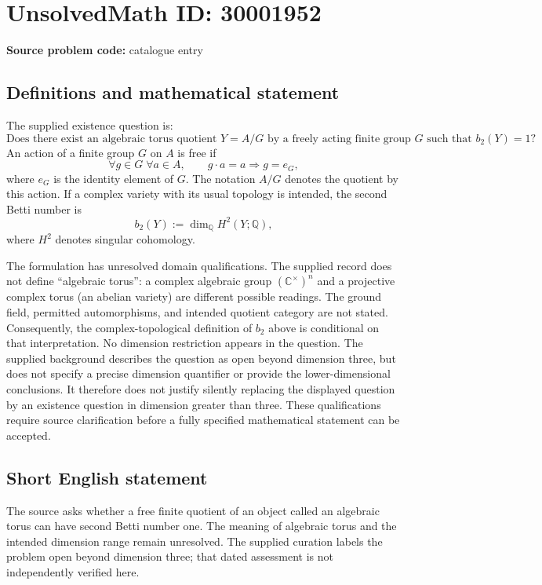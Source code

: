 \documentclass[11pt]{article}
\newcommand{\Q}{\mathbb{Q}}
\newcommand{\C}{\mathbb{C}}
\begin{document}
\section*{UnsolvedMath ID: 30001952}
\textbf{Source problem code:} catalogue entry
\subsection{Definitions and mathematical statement}
The supplied existence question is:
\[
\text{Does there exist an algebraic torus quotient }Y=A/G
\text{ by a freely acting finite group }G
\text{ such that }b_2(Y)=1?
\]
An action of a finite group \(G\) on \(A\) is free if
\[
\forall g\in G\;\forall a\in A,\qquad g\cdot a=a\Longrightarrow g=e_G,
\]
where \(e_G\) is the identity element of \(G\). The notation \(A/G\) denotes the quotient by this action. If a complex variety with its usual topology is intended, the second Betti number is
\[
b_2(Y):=\dim_{\Q}H^2(Y;\Q),
\]
where \(H^2\) denotes singular cohomology.

The formulation has unresolved domain qualifications. The supplied record does not define ``algebraic torus'': a complex algebraic group \((\C^\times)^n\) and a projective complex torus (an abelian variety) are different possible readings. The ground field, permitted automorphisms, and intended quotient category are not stated. Consequently, the complex-topological definition of \(b_2\) above is conditional on that interpretation. No dimension restriction appears in the question. The supplied background describes the question as open beyond dimension three, but does not specify a precise dimension quantifier or provide the lower-dimensional conclusions. It therefore does not justify silently replacing the displayed question by an existence question in dimension greater than three. These qualifications require source clarification before a fully specified mathematical statement can be accepted.
\subsection{Short English statement}
The source asks whether a free finite quotient of an object called an algebraic torus can have second Betti number one. The meaning of algebraic torus and the intended dimension range remain unresolved. The supplied curation labels the problem open beyond dimension three; that dated assessment is not independently verified here.
\end{document}
